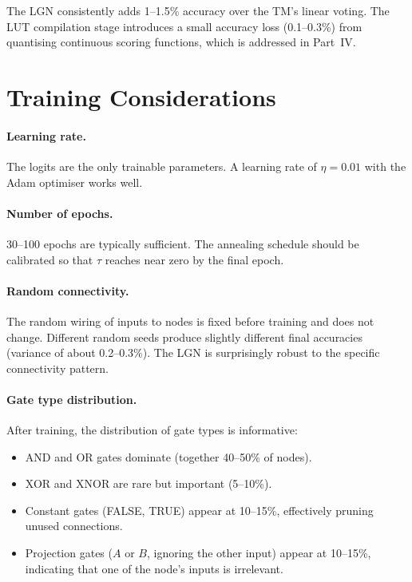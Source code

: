 The LGN consistently adds 1--1.5\% accuracy over the TM's linear
voting. The LUT compilation stage introduces a small accuracy loss
(0.1--0.3\%) from quantising continuous scoring functions, which is
addressed in Part~IV.


\section{Training Considerations}
\label{sec:lgn-considerations}

\paragraph{Learning rate.}
The logits are the only trainable parameters. A learning rate of
$\eta = 0.01$ with the Adam optimiser works well.

\paragraph{Number of epochs.}
30--100 epochs are typically sufficient. The annealing schedule should
be calibrated so that $\tau$ reaches near zero by the final epoch.

\paragraph{Random connectivity.}
The random wiring of inputs to nodes is fixed before training and
does not change. Different random seeds produce slightly different
final accuracies (variance of about 0.2--0.3\%). The LGN is
surprisingly robust to the specific connectivity pattern.

\paragraph{Gate type distribution.}
After training, the distribution of gate types is informative:
\begin{itemize}
  \item AND and OR gates dominate (together 40--50\% of nodes).
  \item XOR and XNOR are rare but important (5--10\%).
  \item Constant gates (FALSE, TRUE) appear at 10--15\%, effectively
    pruning unused connections.
  \item Projection gates ($A$ or $B$, ignoring the other input)
    appear at 10--15\%, indicating that one of the node's inputs
    is irrelevant.
\end{itemize}

